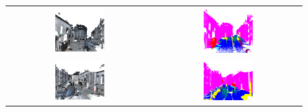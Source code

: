 \begin{figure}
\begin{tabular}{cc}
        \includegraphics[width=0.35\textwidth, height=0.15\textheight]{images/sem3d_data/3.pdf} & 
        \includegraphics[width=0.35\textwidth, height=0.15\textheight]{images/sem3d_data/3_gt.pdf}\\
        
        \includegraphics[width=0.35\textwidth, height=0.15\textheight]{images/sem3d_data/4.pdf} & 
        \includegraphics[width=0.35\textwidth, height=0.15\textheight]{images/sem3d_data/4_gt.pdf}\\
        

\end{tabular}
\end{figure}
